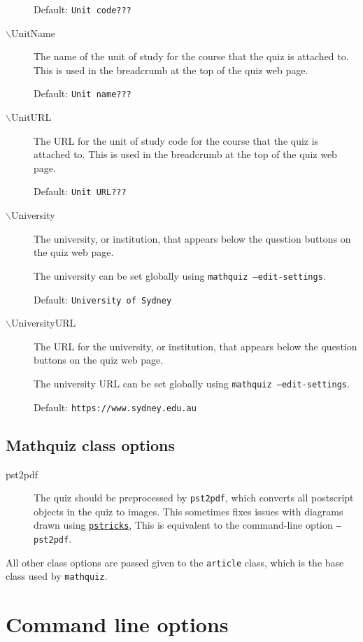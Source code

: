 \documentclass[svgnames]{article}
\newcommand\ctan[1]{\href{https://www.ctan.org/pkg/#1}{\texttt{#1}}}
\begin{document}
\begin{description}
    Default: \texttt{Unit code???}

  \item[$\backslash$UnitName]
    The name of the unit of study for the course that the quiz is attached
    to. This is used in the breadcrumb at the top of the quiz web page.

    Default: \texttt{Unit name???}

  \item[$\backslash$UnitURL]
    The URL for the unit of study code for the course that the quiz is attached
    to. This is used in the breadcrumb at the top of the quiz web page.

    Default: \texttt{Unit URL???}

  \item[$\backslash$University]
    The university, or institution, that appears below the question
    buttons on the quiz web page.

    The university can be set globally using \texttt{mathquiz --edit-settings}.

    Default: \texttt{University of Sydney}

  \item[$\backslash$UniversityURL]
    The URL for the university, or institution, that appears below the
    question buttons on the quiz web page.

    The university URL can be set globally using \texttt{mathquiz --edit-settings}.

    Default: \texttt{https://www.sydney.edu.au}
\end{description}

\subsection{Mathquiz class options}

\begin{description}
  \item[pst2pdf] The quiz should be preprocessed by \texttt{pst2pdf},
  which converts all postscript objects in the quiz to images. This
  sometimes fixes issues with diagrams drawn using \ctan{pstricks},
  This is equivalent to the command-line option \texttt{--pst2pdf}.
\end{description}

All other class options are passed given to the \texttt{article} class, which is
the base class used by \texttt{mathquiz}.

\section{Command line options}
\end{document}
